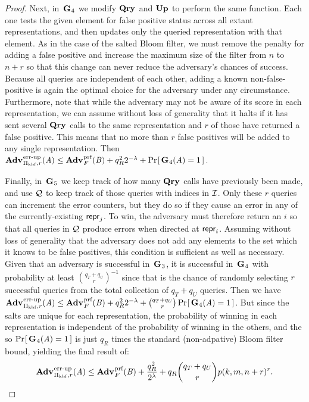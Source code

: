 \begin{proof}
Next, in~$\mathbf{G}\hspace{0.5pt}_4$ we modify $\mathbf{Qry}\hspace{0.5pt}$ and $\mathbf{Up}\hspace{0.5pt}$ to perform the same function. Each one tests the given element for false positive status across all extant representations, and then updates only the queried representation with that element. As in the case of the salted Bloom filter, we must remove the penalty for adding a false positive and increase the maximum size of the filter from $n$ to $n+r$ so that this change can never reduce the adversary's chances of success.  Because all queries are independent of each other, adding a known non-false-positive is again the optimal choice for the adversary under any circumstance. Furthermore, note that while the adversary may not be aware of its score in each representation, we can assume without loss of generality that it halts if it has sent several $\mathbf{Qry}\hspace{0.5pt}$ calls to the same representation and $r$ of those have returned a false positive. This means that no more than $r$ false positives will be added to any single representation. Then $\Adv{\errep}_{\struct_\prfbloom,r}(\advA) \le \Adv{\prf}_F(\advB) + q_R^22^{-\lambda} + \Prob{\G_4(\advA)=1}$.

Finally, in~$\mathbf{G}\hspace{0.5pt}_5$ we keep track of how many $\mathbf{Qry}\hspace{0.5pt}$ calls have previously been made, and use $\mathcal{Q}$ to keep track of those queries with indices in $\mathcal{I}$. Only these $r$ queries can increment the error counters, but they do so if they cause an error in any of the currently-existing $\mathsf{repr}_j$. To win, the adversary must therefore return an $i$ so that all queries in $\mathcal{Q}$ produce errors when directed at $\mathsf{repr}_i$. Assuming without loss of generality that the adversary does not add any elements to the set which it knows to be false positives, this condition is sufficient as well as necessary. Given that an adversary is successful in~$\mathbf{G}\hspace{0.5pt}_3$, it is successful in~$\mathbf{G}\hspace{0.5pt}_4$ with probability at least $\binom{q_T+q_U}{r}^{-1}$ since that is the chance of randomly selecting $r$ successful queries from the total collection of $q_T+q_U$ queries. Then we have $\Adv{\errep}_{\struct_\prfbloom,r}(\advA) \le \Adv{\prf}_F(\advB) + q_R^22^{-\lambda} + \binom{q_T+q_U}{r}\Prob{\G_4(\advA)=1}$. But since the salts are unique for each representation, the probability of winning in each representation is independent of the probability of winning in the others, and the so $\Pr\hspace{-1pt}\left[\,\mathbf{G}\hspace{0.5pt}_4(\mathit{A})=1\,\right]$ is just $q_R$ times the standard (non-adpative) Bloom filter bound, yielding the final result of:
$$\Adv{\errep}_{\struct_\prfbloom,r}(\advA) \le \Adv{\prf}_F(\advB) + \frac{q_R^2}{2^\lambda} + q_R\binom{q_T+q_U}{r}p(k, m, n+r)^r.$$
\missingqed
\end{proof}

